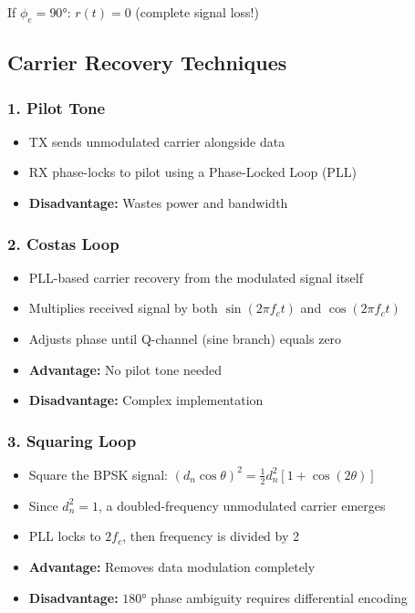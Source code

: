 If $\phi_e = 90°$: $r(t) = 0$ (complete signal loss!)

\subsection{Carrier Recovery Techniques}

\subsubsection{1. Pilot Tone}
\begin{itemize}
\item TX sends unmodulated carrier alongside data
\item RX phase-locks to pilot using a Phase-Locked Loop (PLL)
\item \textbf{Disadvantage:} Wastes power and bandwidth
\end{itemize}

\subsubsection{2. Costas Loop}
\begin{itemize}
\item PLL-based carrier recovery from the modulated signal itself
\item Multiplies received signal by both $\sin(2\pi f_c t)$ and $\cos(2\pi f_c t)$
\item Adjusts phase until Q-channel (sine branch) equals zero
\item \textbf{Advantage:} No pilot tone needed
\item \textbf{Disadvantage:} Complex implementation
\end{itemize}

\subsubsection{3. Squaring Loop}
\begin{itemize}
\item Square the BPSK signal: $(d_n \cos\theta)^2 = \frac{1}{2}d_n^2[1 + \cos(2\theta)]$
\item Since $d_n^2 = 1$, a doubled-frequency unmodulated carrier emerges
\item PLL locks to $2f_c$, then frequency is divided by 2
\item \textbf{Advantage:} Removes data modulation completely
\item \textbf{Disadvantage:} $180°$ phase ambiguity requires differential encoding
\end{itemize}

